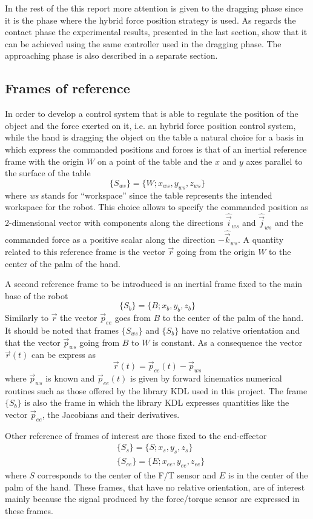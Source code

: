 In the rest of the this report more attention is given to the dragging phase since it is the phase
where the hybrid force position strategy is used. As regards the contact phase the experimental results,
presented in the last section, show that it can be achieved using the same controller used in the dragging
phase. The approaching phase is also described in a separate section.

\subsection{Frames of reference}\label{sec:frames}
In order to develop a control system that is able to regulate the position of the object
and the force exerted on it, i.e. an hybrid force position control system, while the hand
is dragging the object on the table
a natural choice for a basis in which express the commanded positions and forces is that of
an inertial reference frame with the origin $W$ on a point of the table and the $x$ and $y$ axes parallel to the surface
of the table
\[
\{S_{ws}\} = \{W; x_{ws}, y_{ws}, z_{ws} \}
\]
where \emph{ws} stands for ``workspace'' since the table represents the intended workspace
for the robot. This choice allows to specify the commanded position as 2-dimensional vector
with components along the directions $\hat{\vec{i}}_{ws}$ and $\hat{\vec{j}}_{ws}$ and the
commanded force as a positive scalar along the direction $-\hat{\vec{k}}_{ws}$.
A quantity related to this reference frame is the vector $\vec{r}$ going from the origin $W$
to the center of the palm of the hand.
\par
A second reference frame to be introduced is an inertial frame fixed to the main base of the robot
\[
\{S_b\} = \{B; x_b, y_b, z_b \}
\]
Similarly to $\vec{r}$ the vector $\vec{p}_{ee}$ goes from $B$ to the center of the palm of the hand.
It should be noted that frames $\{S_{ws}\}$ and $\{S_b\}$ have no relative orientation and that
the vector $\vec{p}_{ws}$ going from $B$ to $W$ is constant. As a consequence the vector $\vec{r}(t)$
can be express as
\[
\vec{r}(t) = \vec{p}_{ee}(t) - \vec{p}_{ws}
\]
where $\vec{p}_{ws}$ is known and $\vec{p}_{ee}(t)$ is given by forward kinematics
numerical routines such as those offered by the library KDL used in this project.
The frame $\{S_b\}$ is also the frame in which the library KDL expresses quantities
like the vector $\vec{p}_{ee}$, the Jacobians and their derivatives.
\par
Other reference of frames of interest are those fixed to the end-effector
\[
\begin{split}
  &\{S_{s}\} = \{S; x_{s}, y_{s}, z_{s} \}\\
  &\{S_{ee}\} = \{E; x_{ee}, y_{ee}, z_{ee} \}
\end{split}
\]
where $S$ corresponds to the center of the F/T sensor  and $E$ is in the center
of the palm of the hand. These frames, that have no relative orientation,  are of interest
mainly because the signal produced by the force/torque sensor are expressed in these frames.

